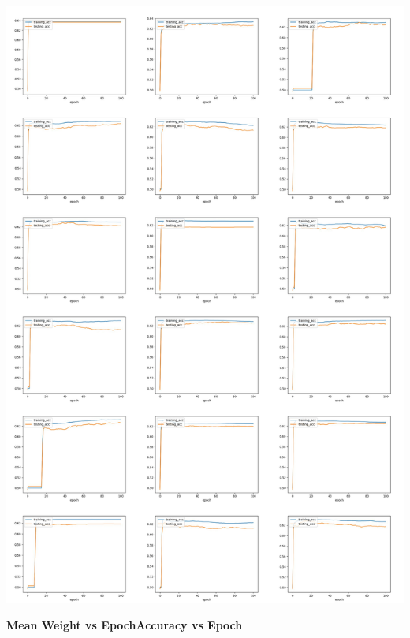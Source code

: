 \documentclass[12pt]{article}
\begin{document}
\includegraphics[scale=0.145]{NCAA_18_accuracy.jpg} \newpage

\textbf{Mean Weight vs Epoch\qquad \qquad Accuracy vs Epoch}
\end{document}
